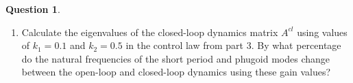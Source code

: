 \documentclass{article}
\theoremstyle{definition}
\newtheorem{question}{Question}
\begin{document}
\begin{question}
\begin{enumerate}
\item Calculate the eigenvalues of the closed-loop dynamics matrix $A^{cl}$ using values of $k_1 = 0.1$ and $k_2 = 0.5$ in the control law from part 3. By what percentage do the natural frequencies of the short period and phugoid modes change between the open-loop and closed-loop dynamics using these gain values?


% 
\end{enumerate}
\end{question}
\clearpage

\vspace{6cm}
\end{document}
